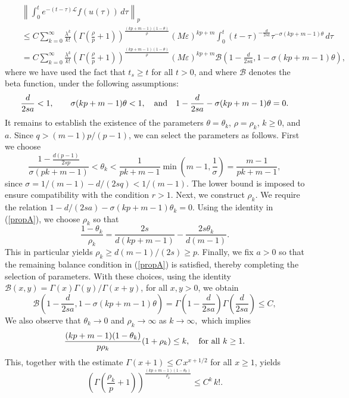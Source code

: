\documentclass[a4paper,11pt]{amsart}
\renewcommand\eqref[1]{(\ref{#1})} %
\numberwithin{equation}{section}
\theoremstyle{plain}
\theoremstyle{definition}
\begin{document}
\begin{eqnarray}\label{eq15}
&{}&\left\|\int_0^te^{-(t-\tau)\mathcal{L}} f(u(\tau))\,d\tau\right\|_{p}\nonumber\\
&{}& \leq C\sum_{k=0}^{\infty}\frac{\lambda^k}{k!}\left(\Gamma\left(\frac{\rho}{p}+1\right)\right)^{\frac{(kp+m-1)(1-\theta)}{\rho}} (M\varepsilon)^{kp+m}\int_0^t(t-\tau)^{-\frac{d}{2 sa}}\tau^{-\sigma(kp+m-1)\theta}\,d\tau\nonumber\\
&{}&=C\sum_{k=0}^{\infty}\frac{\lambda^k}{k!}\left(\Gamma\left(\frac{\rho}{p}+1\right)\right)^{\frac{(kp+m-1)(1-\theta)}{\rho}} (M\varepsilon)^{kp+m}\mathcal{B}\left(1-\frac{d}{2 sa},1-\sigma(kp+m-1)\theta\right),
\end{eqnarray}
where we have used the fact that $t_s\geq t$ for all $t>0$, and where $\mathcal{B}$ denotes the beta function, under the following assumptions:
$$\frac{d}{2 sa}<1,\qquad \sigma(kp+m-1)\theta<1,\quad\hbox{and}\quad 1-\frac{d}{2 sa}-\sigma(kp+m-1)\theta=0.$$
It remains to establish the existence of the parameters $\theta=\theta_k$, $\rho=\rho_k$, $k\geq0$, and $a$. Since $q>(m-1)p/(p-1)$, we can select the  parameters as follows. First we choose
$$\frac{1-\frac{d(p-1)}{2 sp}}{\sigma(pk+m-1)}<\theta_k<\frac{1}{pk+m-1}\min(m-1,\frac{1}{\sigma})=\frac{m-1}{pk+m-1},$$
since $\sigma=1/(m-1)-d/(2s q)<1/(m-1)$. The lower bound is imposed to ensure compatibility with the condition $r>1$. Next, we construct $\rho_k$.  We require the relation $1-d/(2 sa)-\sigma(kp+m-1)\theta_k=0$. Using the identity in \eqref{propA}, we choose $\rho_k$ so that
$$\frac{1-\theta_k}{\rho_k}=\frac{2 s}{d(kp+m-1)}-\frac{2 s\theta_k}{d(m-1)}.$$
This in particular yields $\rho_k\geq d(m-1)/(2 s)\geq p$. Finally, we fix $a>0$ so that the remaining balance condition in \eqref{propA} is satisfied, thereby completing the selection of parameters. With these choices, using the identity $\mathcal{B}(x,y)=\Gamma(x)\Gamma(y)/\Gamma(x+y)$, for all $x,y>0$, we obtain
\begin{equation}\label{eq16}
\mathcal{B}\left(1-\frac{d}{2sa},1-\sigma(kp+m-1)\theta\right)=\Gamma\left(1-\frac{d}{2 sa}\right)\Gamma\left(\frac{d}{2 sa}\right)\leq C,
\end{equation}
We also observe that $\theta_k\longrightarrow 0$ and $\rho_k\longrightarrow \infty$ as $k\rightarrow\infty,$ which implies
$$\frac{(kp+m-1)(1-\theta_k)}{p\rho_k}(1+\rho_k)\leq k, \quad \hbox{for all}\,\, k\geq1.$$
This, together with the estimate $\Gamma(x+1)\leq C\,x^{x+1/2}$ for all $x\geq 1$, yields
\begin{equation}\label{eq17}
\left(\Gamma\left(\frac{\rho_k}{p}+1\right)\right)^{\frac{(kp+m-1)(1-\theta_k)}{\rho_k}} \leq C^k\,k!.
\end{equation}
\end{document}
